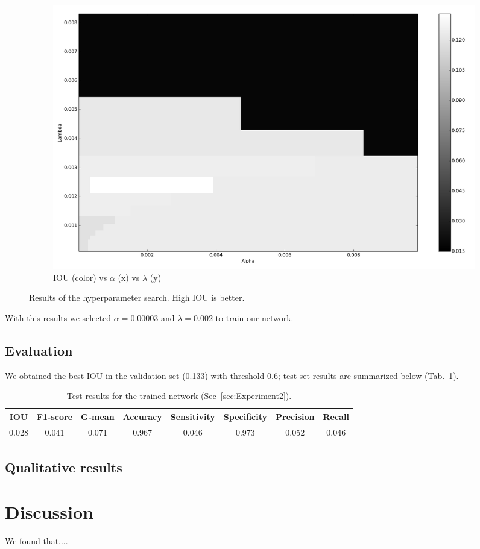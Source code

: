 \begin{figure}[h]
\begin{subfigure}{0.32\textwidth}
		\centering
                \includegraphics[width=\textwidth]{plots/hs4_pcolor.png}
         \caption{IOU (color) vs $\alpha$ (x) vs $\lambda$ (y)}
	\end{subfigure}
	\caption[Hyperparameter search for Experiment 2]{Results of the hyperparameter search. High IOU is better.}
	 \label{fig:Hs4}
\end{figure}

With this results we selected $\alpha = 0.00003$ and $\lambda = 0.002$ to train our network.

\subsection{Evaluation}
We obtained the best IOU in the validation set (0.133) with threshold 0.6; test set results are summarized below (Tab.~\ref{tab:Results2}).
\begin{table}[h]
	\centering
	\begin{tabular}{cccccccc}
	\hline
	\textbf{IOU}	& \textbf{F1-score}	& \textbf{G-mean} &\textbf{Accuracy}	& \textbf{Sensitivity} & \textbf{Specificity} & \textbf{Precision} & \textbf{Recall}\\
	\hline
	 0.028 & 0.041 & 0.071 & 0.967 & 0.046 & 0.973 & 0.052 & 0.046\\
	\hline
	\end{tabular}
	\caption[Results for Experiment 2]{Test results for the trained network (Sec~\ref{sec:Experiment2}).}
	\label{tab:Results2}
\end{table}

\subsection{Qualitative results}


\section{Discussion}
We found that....

